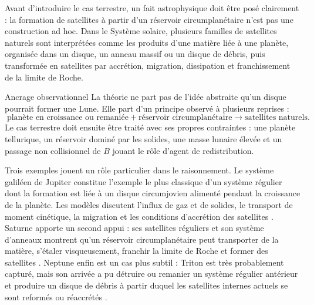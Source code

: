 \documentclass[11pt,a4paper,openany]{report}
\begin{document}
Avant d'introduire le cas terrestre, un fait astrophysique doit être posé clairement : la formation
de satellites à partir d'un réservoir circumplanétaire n'est pas une construction ad hoc. Dans le
Système solaire, plusieurs familles de satellites naturels sont interprétées comme les produits
d'une matière liée à une planète, organisée dans un disque, un anneau massif ou un disque de
débris, puis transformée en satellites par accrétion, migration, dissipation et franchissement de
la limite de Roche.

\begin{principe}{Ancrage observationnel}
La théorie ne part pas de l'idée abstraite qu'un disque pourrait former une Lune. Elle part d'un
principe observé à plusieurs reprises :
\begin{equation}
\boxed{\;\text{planète en croissance ou remaniée}+\text{réservoir circumplanétaire}
\longrightarrow \text{satellites naturels}.\;}
\label{eq:ancrage-satellites}
\end{equation}
Le cas terrestre doit ensuite être traité avec ses propres contraintes : une planète tellurique,
un réservoir dominé par les solides, une masse lunaire élevée et un passage non collisionnel de
$B$ jouant le rôle d'agent de redistribution.
\end{principe}

Trois exemples jouent un rôle particulier dans le raisonnement. Le système galiléen de Jupiter
constitue l'exemple le plus classique d'un système régulier dont la formation est liée à un disque
circumjovien alimenté pendant la croissance de la planète. Les modèles discutent l'influx de gaz
et de solides, le transport de moment cinétique, la migration et les conditions d'accrétion des
satellites \cite{CanupWard2002,MosqueiraEstrada2003a,CanupWard2006,Nimmo2026}. Saturne apporte
un second appui : ses satellites réguliers et son système d'anneaux montrent qu'un réservoir
circumplanétaire peut transporter de la matière, s'étaler visqueusement, franchir la limite de
Roche et former des satellites \cite{Charnoz2010,CridaCharnoz2012,Blanc2025}. Neptune enfin est
un cas plus subtil : Triton est très probablement capturé, mais son arrivée a pu détruire ou
remanier un système régulier antérieur et produire un disque de débris à partir duquel les
satellites internes actuels se sont reformés ou réaccrétés
\cite{AgnorHamilton2006,BanfieldMurray1992,Showalter2019,Szulagyi2018,Davis2026}.
\end{document}
